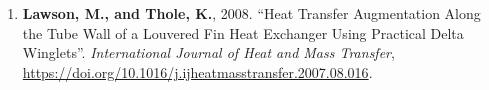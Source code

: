 \begin{enumerate}[leftmargin=1.5pc,itemsep=0pt,parsep=0pt,topsep=0pt,partopsep=1pt]
\item \textbf{Lawson, M., and Thole, K.}, 2008. ``Heat Transfer Augmentation Along the Tube Wall of a Louvered Fin Heat Exchanger Using Practical Delta Winglets''. \emph{International Journal of Heat and Mass Transfer}, \href{https://doi.org/10.1016/j.ijheatmasstransfer.2007.08.016}{https://doi.org/10.1016/j.ijheatmasstransfer.2007.08.016}.


\end{enumerate}



